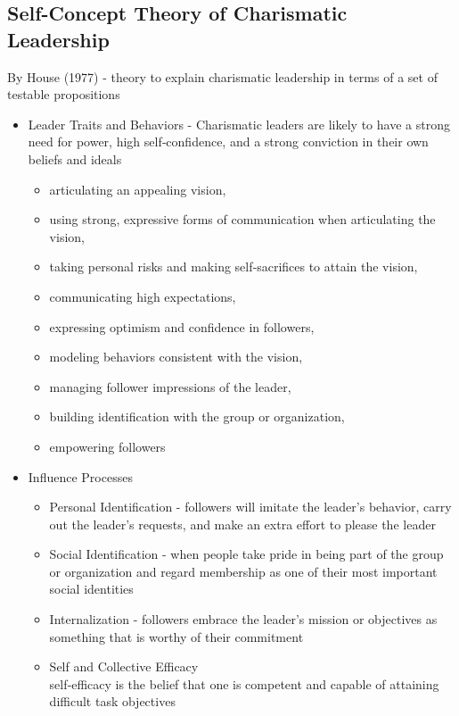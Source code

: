 
\subsection{Self-Concept Theory of Charismatic Leadership} %
\label{sub:self_concept_theory_of_charismatic_leadership}
By House (1977) - theory to explain charismatic leadership in terms of a set of testable propositions

\begin{itemize}
	\item Leader Traits and Behaviors - Charismatic leaders are likely to have a strong need for power, high self‐confidence, and a strong conviction in their own beliefs and ideals
	\begin{itemize}
		\item articulating an appealing vision, 
		\item using strong, expressive forms of communication when articulating the vision, 
		\item taking personal risks and making self‐sacrifices to attain the vision,
		\item communicating high expectations, 
		\item expressing optimism and confidence in followers,
		\item modeling behaviors consistent with the vision, 
		\item managing follower impressions of the leader, 
		\item building identification with the group or organization,  
		\item empowering followers
	\end{itemize}
	\item Influence Processes
	\begin{itemize}
		\item Personal Identification - followers will imitate the leader’s behavior, carry out the leader’s requests, and make an extra effort to please the leader
		\item Social Identification - when people take pride in being part of the group or organization and regard membership as one of their most important social identities
		\item Internalization - followers embrace the leader’s mission or objectives as something that is worthy of their commitment
		\item Self and Collective Efficacy 
			\\self‐efficacy is the belief that one is competent and capable of attaining difficult task objectives

\end{itemize}
\end{itemize}
